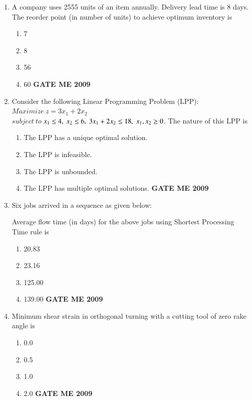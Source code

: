 \documentclass[journal]{IEEEtran}
\begin{document}
\begin{enumerate}[leftmargin=0pt]
\item A company uses 2555 units of an item annually. Delivery lead time is 8 days. The reorder point (in number of units) to achieve optimum inventory is
\begin{enumerate}[label=(\Alph*)]
  \item 7
  \item 8
  \item 56
  \item 60
\hfill{\textbf{GATE ME 2009}}
\end{enumerate}

\item Consider the following Linear Programming Problem (LPP): \\      $Maximize \ z = 3x_1 + 2x_2$ \\$subject\  to\   $$x_1 \leq 4,\\\ x_2 \leq 6,\\\ 3x_1 + 2x_2 \leq 18,\\\ x_1, x_2 \geq 0$. The nature of this LPP is
\begin{enumerate}[label=(\Alph*)]
  \item The LPP has a unique optimal solution.
  \item The LPP is infeasible.
  \item The LPP is unbounded.
  \item The LPP has multiple optimal solutions.
\hfill{\textbf{GATE ME 2009}}
\end{enumerate}

\item Six jobs arrived in a sequence as given below:\\
\begin{table}[h]
    \centering
    
\end{table}

Average flow time (in days) for the above jobs using Shortest Processing Time rule is
\begin{enumerate}[label=(\Alph*)]
  \item 20.83
  \item 23.16
  \item 125.00
  \item 139.00
\hfill{\textbf{GATE ME 2009}}
\end{enumerate}

\item Minimum shear strain in orthogonal turning with a cutting tool of zero rake angle is
\begin{enumerate}[label=(\Alph*)]
  \item 0.0
  \item 0.5
  \item 1.0
  \item 2.0
\hfill{\textbf{GATE ME 2009}}
\end{enumerate}



\end{enumerate}
\end{document}
